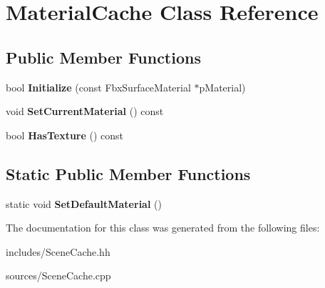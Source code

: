 \hypertarget{class_material_cache}{\section{Material\-Cache Class Reference}
\label{class_material_cache}
}
\subsection*{Public Member Functions}
\begin{DoxyCompactItemize}
\item 
\hypertarget{class_material_cache_a2f8d3d86af579091b7b719aa1db45a0d}{bool {\bfseries Initialize} (const Fbx\-Surface\-Material $\ast$p\-Material)}\label{class_material_cache_a2f8d3d86af579091b7b719aa1db45a0d}

\item 
\hypertarget{class_material_cache_a98c59f26dffdc961d0546bddb8b2710d}{void {\bfseries Set\-Current\-Material} () const }\label{class_material_cache_a98c59f26dffdc961d0546bddb8b2710d}

\item 
\hypertarget{class_material_cache_a046d9aa49df9eb2f5b432fe65ba631fb}{bool {\bfseries Has\-Texture} () const }\label{class_material_cache_a046d9aa49df9eb2f5b432fe65ba631fb}

\end{DoxyCompactItemize}
\subsection*{Static Public Member Functions}
\begin{DoxyCompactItemize}
\item 
\hypertarget{class_material_cache_a51881d2f46aa076ca4dfdce641e8fe1f}{static void {\bfseries Set\-Default\-Material} ()}\label{class_material_cache_a51881d2f46aa076ca4dfdce641e8fe1f}

\end{DoxyCompactItemize}


The documentation for this class was generated from the following files\-:\begin{DoxyCompactItemize}
\item 
includes/Scene\-Cache.\-hh\item 
sources/Scene\-Cache.\-cpp\end{DoxyCompactItemize}

